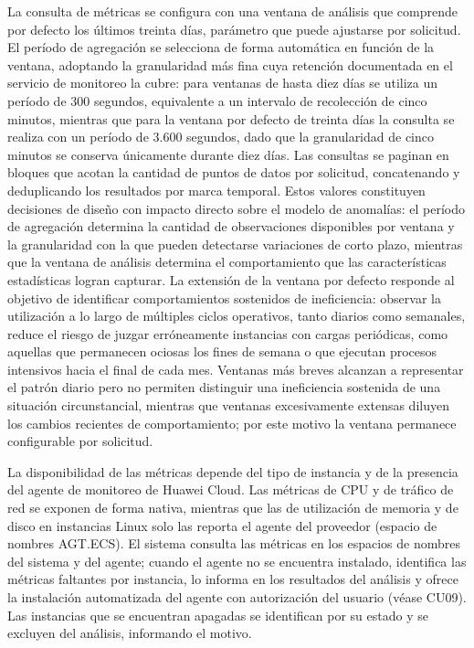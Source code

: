 La consulta de métricas se configura con una ventana de análisis que
comprende por defecto los últimos treinta días, parámetro que puede
ajustarse por solicitud. El período de agregación se selecciona de forma
automática en función de la ventana, adoptando la granularidad más fina
cuya retención documentada en el servicio de monitoreo la cubre: para
ventanas de hasta diez días se utiliza un período de 300 segundos,
equivalente a un intervalo de recolección de cinco minutos, mientras que
para la ventana por defecto de treinta días la consulta se realiza con un
período de 3.600 segundos, dado que la granularidad de cinco minutos se
conserva únicamente durante diez días. Las consultas se paginan en bloques
que acotan la cantidad de puntos de datos por solicitud, concatenando y
deduplicando los resultados por marca temporal. Estos valores constituyen
decisiones de diseño con impacto directo sobre el modelo de anomalías: el
período de agregación determina la cantidad de observaciones disponibles
por ventana y la granularidad con la que pueden detectarse variaciones de
corto plazo, mientras que la ventana de análisis determina el
comportamiento que las características estadísticas logran capturar. La
extensión de la ventana por defecto responde al objetivo de identificar
comportamientos sostenidos de ineficiencia: observar la utilización a lo
largo de múltiples ciclos operativos, tanto diarios como semanales, reduce
el riesgo de juzgar erróneamente instancias con cargas periódicas, como
aquellas que permanecen ociosas los fines de semana o que ejecutan
procesos intensivos hacia el final de cada mes. Ventanas más breves
alcanzan a representar el patrón diario pero no permiten distinguir una
ineficiencia sostenida de una situación circunstancial, mientras que
ventanas excesivamente extensas diluyen los cambios recientes de
comportamiento; por este motivo la ventana permanece configurable por
solicitud.

La disponibilidad de las métricas depende del tipo de instancia y de la presencia del agente de monitoreo de Huawei Cloud. Las métricas de CPU y de tráfico de red se exponen de forma nativa, mientras que las de utilización de memoria y de disco en instancias Linux solo las reporta el agente del proveedor (espacio de nombres AGT.ECS). El sistema consulta las métricas en los espacios de nombres del sistema y del agente; cuando el agente no se encuentra instalado, identifica las métricas faltantes por instancia, lo informa en los resultados del análisis y ofrece la instalación automatizada del agente con autorización del usuario (véase CU09). Las instancias que se encuentran apagadas se identifican por su estado y se excluyen del análisis, informando el motivo.

